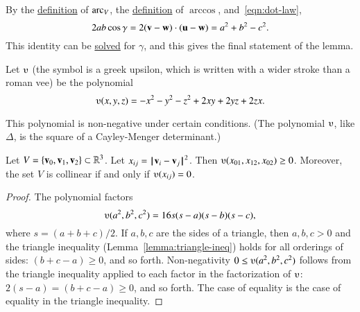 \begin{proved}
By the \hyperref[def:angle]{definition} of $\operatorname{arc}_V$, the
\hyperref[def:arccos]{definition} of $\arccos$, and~\eqref{eqn:dot-law},
\begin{displaymath}
2 a b \cos \gamma = 2 ({\mathbf v} - {\mathbf w})\cdot ({\mathbf u} - {\mathbf w}) = a^2 + b^2 - c^2.
\end{displaymath}
This identity can be \hyperref[def:arccos]{solved} for $\gamma$, and
this gives the final statement of the lemma.  \swallowed\end{proved}


\begin{definition}[$\ups$]\label{def:ups}
Let $\ups$ (the symbol is a greek upsilon, which is written with a
wider stroke than a roman vee) be the polynomial
\begin{displaymath}\ups(x,y,z) = -x^2 - y^2 - z^2 + 2 x y + 2 y z + 2
  z x.\end{displaymath}
%
\end{definition}



This polynomial is non-negative under certain conditions. (The polynomial
$\ups$, like $\Delta$, 
is the square of a Cayley-Menger determinant.)  


\begin{lemma}[]\label{lemma:ups} Let
  $V=\{{\mathbf v}_0,{\mathbf v}_1,{\mathbf v}_2\}\subset\mathbb{R}^3$.  Let $x_{ij} =
  \norm{\v_i}{\v_j}^2$.  Then $\ups(x_{01},x_{12},x_{02})\ge 0$.
  Moreover, the set $V$ is collinear if and only if $\ups(x_{ij}) =
  0$.%
\end{lemma}

\begin{proof}
The polynomial factors
\begin{equation}\label{eqn:ups}
\ups(a^2,b^2,c^2) = 16 s (s-a) (s-b)
  (s-c),
\end{equation}
where $s = (a+b+c)/2$.  If $a,b,c$ are the sides of a triangle, then
$a,b,c>0$ and the triangle inequality (Lemma~\ref{lemma:triangle-ineq})
holds for all orderings of sides: $(b+c-a)\ge 0$, and so forth.
Non-negativity $0\le \ups(a^2,b^2,c^2)$ follows from the triangle
inequality applied to each factor in the factorization of $\ups$:
$2(s-a) = (b+c-a) \ge0$, and so forth.  The case of equality is the
case of equality in the triangle inequality.
%
%
\end{proof}


